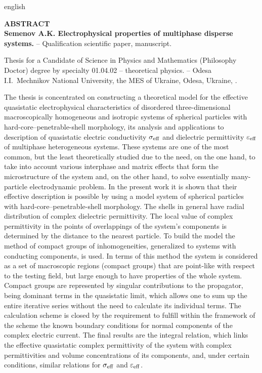 \begin{otherlanguage*}{english}
\begin{center}
    {\normalfont \textbf{
    	ABSTRACT\\
    	Semenov A.K. Electrophysical properties of multiphase disperse systems.} -- Qualification scientific paper, manuscript.}
\end{center}
\vskip 5pt

Thesis for a Candidate of Science in Physics and Mathematics (Philosophy Doctor) degree by specialty 01.04.02 -- theoretical physics. -- Odesa I.I.~Mechnikov National University, the MES of Ukraine, Odesa, Ukraine, \the\year.

\vskip 5pt

The thesis is concentrated on constructing a theoretical model for the effective quasistatic electrophysical characteristics of disordered three-dimensional macroscopically homogeneous and isotropic systems of spherical particles with hard-core--penetrable-shell morphology, its analysis and applications to description of quasistatic electric conductivity $ \sigma_{\rm eff}$ and dielectric permittivity $\varepsilon_ {\rm eff} $ of multiphase heterogeneous systems.
These systems are one of the most common, but the least theoretically studied due to the need, on the one hand, to take into account various interphase and matrix effects that form the microstructure of the system and, on the other hand, to solve essentially many-particle electrodynamic problem.
In the present work it is shown that their effective description is possible by using a model system of spherical particles with hard-core--penetrable-shell morphology. The shells in general have radial distribution of complex dielectric permittivity.
The local value of complex permittivity in the points of  overlappings of the system's components is determined by the distance to the nearest particle.
To build the model the method of compact groups of inhomogeneities, generalized to systems with conducting components, is used. In terms of this method the system is considered as a set of macroscopic regions (compact groups) that are point-like with respect to the testing field, but large enough to have properties of the whole system.
Compact groups are represented by singular contributions to the propagator, being dominant terms in the quasistatic limit, which allows one to sum up the entire iterative series without the need to calculate its individual terms.
The calculation scheme is closed by the requirement to fulfill  within the framework of the scheme the known boundary conditions for normal components of the complex electric current.
The final results are the integral relation, which links the effective quasistatic complex permittivity of the system with complex permittivities and volume concentrations of its components, and, under certain conditions, similar relations for $ \sigma_ {\rm eff} $ and $ \varepsilon_ {\rm eff} $.


\end{otherlanguage*}
